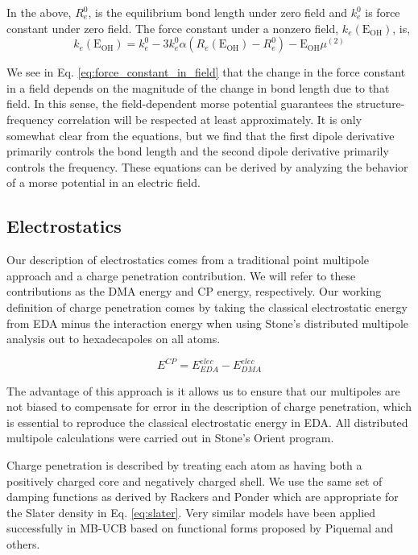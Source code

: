 \documentclass[journal=jacsat,manuscript=article]{achemso}
\begin{document}
In the above, $R_e^0$, is the equilibrium bond length under zero field and $k_e^0$ is
force constant under zero field. The force constant under a nonzero field, $k_e(\mathrm{E_{OH}})$, is,
\begin{equation}
  k_e(\mathrm{E_{OH}})=k_e^0-3k_e^0\alpha\left(R_e(\mathrm{E_{OH}})-R_e^0\right)-\mathrm{E_{OH}}\mu^{(2)}
  \label{eq:force_constant_in_field}
\end{equation}

We see in Eq. \ref{eq:force_constant_in_field} that the change in the force constant in a field depends
on the magnitude of the change in bond length due to that field. In this sense, the field-dependent
morse potential guarantees the structure-frequency correlation will be respected at least approximately.
It is only somewhat clear from the equations, but we find that the first dipole derivative
primarily controls the bond length and the second dipole derivative primarily controls the frequency.
These equations can be derived by analyzing the behavior of a morse potential in an electric field.\cite{boyer2019beyond}


\subsection*{Electrostatics}

Our description of electrostatics comes from a traditional
point multipole approach and a charge penetration contribution. We will refer to
these contributions as the DMA energy and CP energy, respectively.
Our working definition of charge penetration comes by taking the
classical electrostatic energy from EDA minus the interaction energy
when using Stone's distributed multipole analysis\cite{stone1981distributed,stone1985distributeda}
out to hexadecapoles on all atoms.

\begin{equation}
  E^{CP}=E^{elec}_{EDA}-E^{elec}_{DMA}
  \label{eq:cp}
\end{equation}

The advantage of this approach is it allows us to ensure that
our multipoles are not biased to compensate for error in the
description of charge penetration, which is essential to reproduce
the classical electrostatic energy in EDA.
All distributed multipole calculations were carried out
in Stone's Orient program.\cite{stone2002orient}

Charge penetration is described by treating each atom as having both a positively
charged core and negatively charged shell. We use the same set of damping functions
as derived by Rackers and Ponder which are appropriate for the Slater density in Eq. \ref{eq:slater}.\cite{rackers2021polarizable}
Very similar models have been applied successfully in MB-UCB\cite{das2019development}
based on functional forms proposed by Piquemal\cite{piquemal2003improved} and others\cite{wang2015general,rackers2017optimized}.
\end{document}

